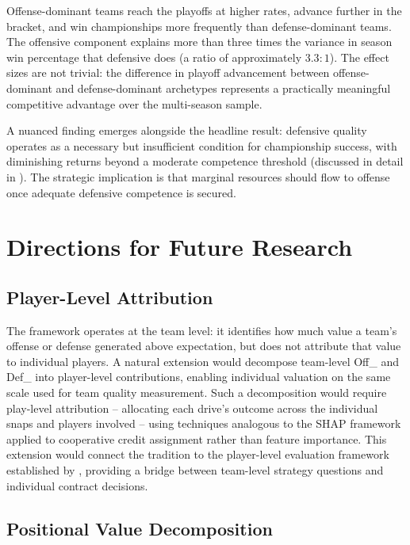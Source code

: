 Offense-dominant teams reach the playoffs at higher rates, advance further in the bracket, and win championships more frequently than defense-dominant teams. The offensive \xvoa{} component explains more than three times the variance in season win percentage that defensive \xvoa{} does (a ratio of approximately $3.3 : 1$). The effect sizes are not trivial: the difference in playoff advancement between offense-dominant and defense-dominant archetypes represents a practically meaningful competitive advantage over the multi-season sample.

A nuanced finding emerges alongside the headline result: defensive quality operates as a necessary but insufficient condition for championship success, with diminishing returns beyond a moderate competence threshold (discussed in detail in ). The strategic implication is that marginal resources should flow to offense once adequate defensive competence is secured.


\section{Directions for Future Research}
\label{sec:future-research}

\subsection{Player-Level Attribution}

The \gds{} framework operates at the team level: it identifies how much value a team's offense or defense generated above expectation, but does not attribute that value to individual players. A natural extension would decompose team-level Off\_\xvoa{} and Def\_\xvoa{} into player-level contributions, enabling individual valuation on the same scale used for team quality measurement. Such a decomposition would require play-level attribution  -- allocating each drive's outcome across the individual snaps and players involved  -- using techniques analogous to the SHAP framework \parencite{lundberg2017shap} applied to cooperative credit assignment rather than feature importance. This extension would connect the \gds{} tradition to the player-level evaluation framework established by \textcite{yurko2019nflwar}, providing a bridge between team-level strategy questions and individual contract decisions.

\subsection{Positional Value Decomposition}

